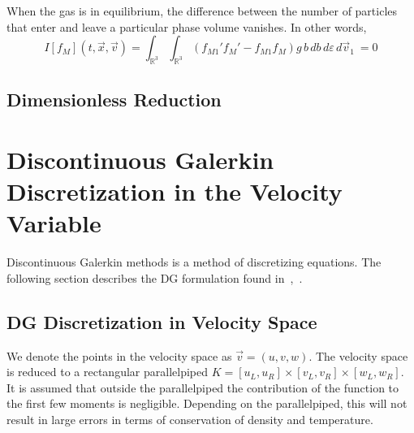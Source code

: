 \documentclass[12pt]{CSUNthesis}
\def\R{\mathbb{R}}
\def\R{\mathbb{R}}
\newcommand{\vecx}{\vec{x}}
\newcommand{\vecv}{\vec{v}}
\begin{document}
When the gas is in equilibrium, the difference between the number of particles that enter and leave a particular phase volume vanishes. In other words, 
\begin{equation*}
I[f_M](t,\vecx,\vecv) = \int_{\R^3} \int_{\R^3} (f_{M1}'f_M' - f_{M1} f_M)  g\, b\, db\, d\varepsilon\, d\vecv_1\ = 0
\end{equation*}

\section{Dimensionless Reduction}


\chapter{Discontinuous Galerkin Discretization in the Velocity Variable}

Discontinuous Galerkin methods is a method of discretizing equations. The following section describes the DG formulation found in~\cite{AlekseenkoJosyula2012},~\cite{AlekseenkoNguyenWood2015}.

\section{DG Discretization in Velocity Space}
We denote the points in the velocity space as $\vec{v} = (u,v,w)$. The velocity space is reduced to a rectangular parallelpiped $K=[u_L, u_R] \times [v_L,v_R] \times [w_L,w_R]$. It is assumed that outside the parallelpiped the contribution of the function to the first few moments is negligible. Depending on the parallelpiped, this will not result in large errors in terms of conservation of density and temperature. 
\end{document}
